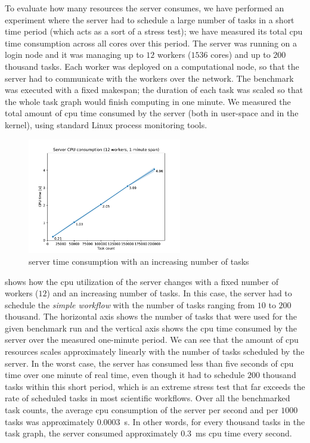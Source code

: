 To evaluate how many resources the server consumes, we have performed an experiment where the
server had to schedule a large number of tasks in a short time period (which acts as a sort of a
stress test); we have measured its total \gls{cpu} time consumption across all cores over this
period. The server was running on a login node and it was managing up to $12$ workers
($1536$ cores) and up to $200$ thousand tasks. Each worker was
deployed on a computational node, so that the server had to communicate with the workers over the
network. The benchmark was executed with a fixed makespan; the duration of each task was scaled so
that the whole task graph would finish computing in one minute. We measured the total amount of
\gls{cpu} time consumed by the server (both in user-space and in the kernel), using
standard Linux process monitoring tools.

\begin{figure}[h]
	\centering
	\includegraphics[width=0.6\textwidth]{imgs/hq/charts/server-utilization-tasks}
	\caption{\hyperqueue{} server  time consumption with an increasing number
	of tasks}
	\label{fig:hq-server-cpu-consumption-tasks}
\end{figure}

 shows how the \gls{cpu} utilization of the
server changes with a fixed number of workers ($12$) and an increasing number of
tasks. In this case, the server had to schedule the \emph{simple workflow} with the number of tasks
ranging from $10$ to $200$ thousand. The horizontal axis shows
the number of tasks that were used for the given benchmark run and the vertical axis shows the
\gls{cpu} time consumed by the server over the measured one-minute period. We can see that the
amount of \gls{cpu} resources scales approximately linearly with the number of tasks
scheduled by the server. In the worst case, the server has consumed less than five seconds of
\gls{cpu} time over one minute of real time, even though it had to schedule
$200$ thousand tasks within this short period, which is an extreme stress test
that far exceeds the rate of scheduled tasks in most scientific workflows. Over all the benchmarked
task counts, the average \gls{cpu} consumption of the server per second and per
$1000$ tasks was approximately \SI{0.0003}{\second}. In other words, for every
thousand tasks in the task graph, the server consumed approximately \SI{0.3}{\milli\second}
\gls{cpu} time every second.


